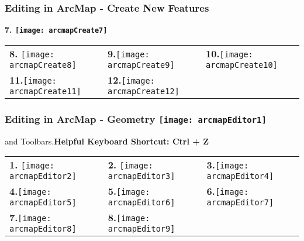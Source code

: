 \documentclass[t]{beamer} %
\begin{document}

\begin{frame}
\frametitle{Editing in ArcMap - Create New Features}
\textbf{7. \texttt{[image: arcmapCreate7]}}
\vspace{-0.10in}
\begin{table}
\begin{tabular}{l l l}
\textbf{8.} \texttt{[image: arcmapCreate8]} & \textbf{9.}\texttt{[image: arcmapCreate9]} & \textbf{10.}\texttt{[image: arcmapCreate10]} \\
\textbf{11.}\texttt{[image: arcmapCreate11]} & \textbf{12.}\texttt{[image: arcmapCreate12]} 
\end{tabular}
\end{table}
\end{frame}


\begin{frame}
\frametitle{Editing in ArcMap - Geometry \hfill\texttt{[image: arcmapEditor1]}}
 and  Toolbars.\hfill\tiny\textbf{{Helpful Keyboard  Shortcut: Ctrl + Z}}
\vspace{-0.2in}
\normalsize
\begin{table}
\begin{tabular}{l l l}
\textbf{1.} \texttt{[image: arcmapEditor2]} & \textbf{2.} \texttt{[image: arcmapEditor3]} & \textbf{3.}\texttt{[image: arcmapEditor4]} \\
\textbf{4.}\texttt{[image: arcmapEditor5]} & \textbf{5.}\texttt{[image: arcmapEditor6]} & \textbf{6.}\texttt{[image: arcmapEditor7]}  \\
\textbf{7.}\texttt{[image: arcmapEditor8]} & \textbf{8.}\texttt{[image: arcmapEditor9]}
\end{tabular}
\end{table}

\end{frame}

\end{document}

